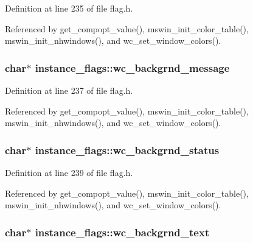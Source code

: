 Definition at line 235 of file flag.\+h.



Referenced by get\+\_\+compopt\+\_\+value(), mswin\+\_\+init\+\_\+color\+\_\+table(), mswin\+\_\+init\+\_\+nhwindows(), and wc\+\_\+set\+\_\+window\+\_\+colors().

\hypertarget{structinstance__flags_a0d75ca0bd6d66c064a8a886fbf2982fb}{
\subsubsection[{wc\+\_\+backgrnd\+\_\+message}]{\setlength{\rightskip}{0pt plus 5cm}char$\ast$ instance\+\_\+flags\+::wc\+\_\+backgrnd\+\_\+message}}\label{structinstance__flags_a0d75ca0bd6d66c064a8a886fbf2982fb}


Definition at line 237 of file flag.\+h.



Referenced by get\+\_\+compopt\+\_\+value(), mswin\+\_\+init\+\_\+color\+\_\+table(), mswin\+\_\+init\+\_\+nhwindows(), and wc\+\_\+set\+\_\+window\+\_\+colors().

\hypertarget{structinstance__flags_acacbb00c74728d404a78dc70f76710a5}{
\subsubsection[{wc\+\_\+backgrnd\+\_\+status}]{\setlength{\rightskip}{0pt plus 5cm}char$\ast$ instance\+\_\+flags\+::wc\+\_\+backgrnd\+\_\+status}}\label{structinstance__flags_acacbb00c74728d404a78dc70f76710a5}


Definition at line 239 of file flag.\+h.



Referenced by get\+\_\+compopt\+\_\+value(), mswin\+\_\+init\+\_\+color\+\_\+table(), mswin\+\_\+init\+\_\+nhwindows(), and wc\+\_\+set\+\_\+window\+\_\+colors().

\hypertarget{structinstance__flags_a82623e4be9e2d9e800057ab9dee47186}{
\subsubsection[{wc\+\_\+backgrnd\+\_\+text}]{\setlength{\rightskip}{0pt plus 5cm}char$\ast$ instance\+\_\+flags\+::wc\+\_\+backgrnd\+\_\+text}}\label{structinstance__flags_a82623e4be9e2d9e800057ab9dee47186}


